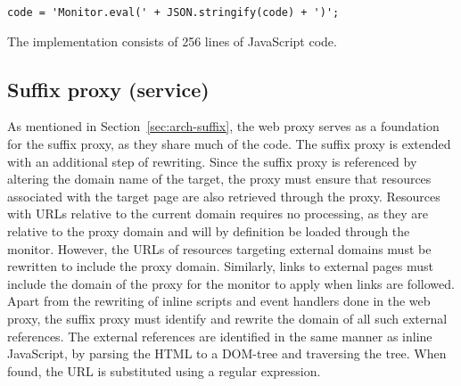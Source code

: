 \documentclass{llncs}
\begin{document}
\begin{lstlisting}[language=langsmall,label=lst:wrap-monitor, caption=Example of monitor wrapping]
code = 'Monitor.eval(' + JSON.stringify(code) + ')';
\end{lstlisting}

The implementation consists of 256 lines of JavaScript code.



\subsection{Suffix proxy (service)}



%

As mentioned in Section~\ref{sec:arch-suffix}, the web proxy serves as a 
foundation for the suffix proxy, as they share much of the code. The suffix proxy is extended with an additional step of rewriting. 
Since the suffix proxy is referenced by altering the domain name of the target, 
the proxy must ensure that resources associated with the target page are also 
retrieved through the proxy. Resources with URLs relative to the current domain 
requires no processing, as they are relative to the proxy domain and will by 
definition be loaded through the monitor. 
However, the URLs of resources targeting external domains must be rewritten to 
include the proxy domain. Similarly, links to external pages must include the domain of the proxy
for the %
monitor%
to apply 
when links are followed.
Apart from the rewriting of inline 
scripts and event handlers done in the web proxy, the suffix proxy must 
identify and rewrite the domain of all such external references. 
The external references are identified in the same manner as inline JavaScript, 
by parsing the HTML to a DOM-tree and traversing the tree. When found, the 
URL is substituted using a regular expression.%
\end{document}
